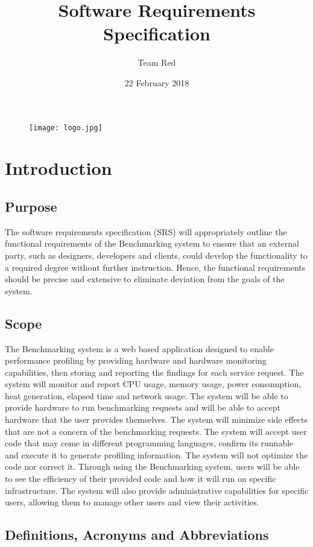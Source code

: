 \documentclass{article}
\title{Software Requirements Specification}
\date{22 February 2018}
\author{Team Red}
\begin{document}
    \begin{figure}[!t]
    	\centering
    	\texttt{[image: logo.jpg]}
    \end{figure}
	\maketitle
	\newpage
	\tableofcontents
	\newpage
	
	\section{Introduction}
	\subsection{Purpose}
    The software requirements speciﬁcation (SRS) will appropriately outline the functional requirements of the Benchmarking system to ensure that an external party, such as designers, developers and clients, could develop the functionality to a required degree without further instruction. Hence, the functional requirements should be precise and extensive to eliminate deviation from the goals of the system. 
	\subsection{Scope}
    The Benchmarking system is a web based application designed to enable performance profiling by providing hardware and hardware monitoring capabilities, then storing and reporting the findings for each service request. The system will monitor and report CPU usage, memory usage, power consumption, heat generation, elapsed time and network usage. The system will be able to provide hardware to run benchmarking requests and will be able to accept hardware that the user provides themselves. The system will minimize side effects that are not a concern of the benchmarking requests. The system will accept user code that may come in different programming languages, confirm its runnable and execute it to generate profiling information. The system will not optimize the code nor correct it. Through using the Benchmarking system, users will be able to see the efficiency of their provided code and how it will run on specific infrastructure. The system will also provide administrative capabilities for specific users, allowing them to manage other users and view their activities. 
	\subsection{Definitions, Acronyms and Abbreviations}
\end{document}
